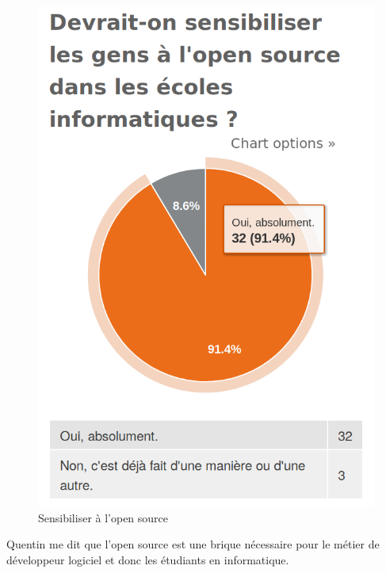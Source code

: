 				\begin{figure}[!htb]
					\center
					\includegraphics[scale=0.28]{./img/a6}
					\caption{Sensibiliser à l'open source}
				\end{figure}

				\newpage

				Quentin  me dit que l'open source est une brique nécessaire pour le métier de développeur logiciel et donc les étudiants en informatique.

				\begin{center}
					\textit{
					}
				\end{center}

